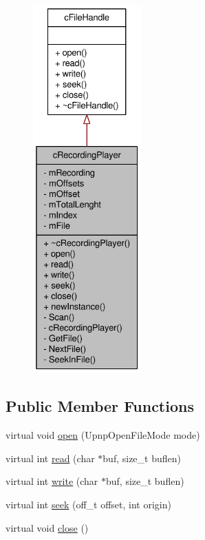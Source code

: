 \begin{figure}[H]
\begin{center}
\leavevmode
\includegraphics[height=400pt]{classcRecordingPlayer__coll__graph}
\end{center}
\end{figure}
\subsection*{Public Member Functions}
\begin{CompactItemize}
\item 
virtual void \hyperlink{classcRecordingPlayer_e7ad4362d821f38db5143c0aeff15d97}{open} (UpnpOpenFileMode mode)
\item 
virtual int \hyperlink{classcRecordingPlayer_e0fda8b0be8e47133698f1763e649b3d}{read} (char $\ast$buf, size\_\-t buflen)
\item 
virtual int \hyperlink{classcRecordingPlayer_7dd0cb78ae8032eb677f01d71187d6e0}{write} (char $\ast$buf, size\_\-t buflen)
\item 
virtual int \hyperlink{classcRecordingPlayer_43f7ba867374d6be9e78c68c872bf608}{seek} (off\_\-t offset, int origin)
\item 
virtual void \hyperlink{classcRecordingPlayer_5e81aeecd16f89e432690a9b05d8dd6a}{close} ()
\end{CompactItemize}
